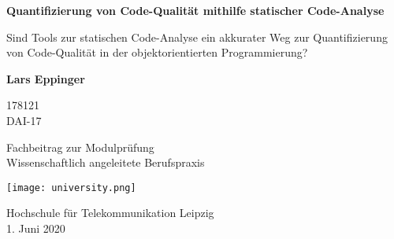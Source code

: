 \begin{titlepage}
    \begin{center}
        \vspace*{1cm}
        
        \Huge
        \textbf{Quantifizierung von Code-Qualität mithilfe statischer Code-Analyse}
        
        \vspace{0.5cm}
        \LARGE
        Sind Tools zur statischen Code-Analyse ein akkurater Weg zur Quantifizierung von Code-Qualität in der objektorientierten Programmierung?
        
        \vspace{1.5cm}
        
        \textbf{Lars Eppinger}

        \Large
        178121\\
        DAI-17
        
        \vfill
        
        Fachbeitrag zur Modulprüfung\\Wissenschaftlich angeleitete Berufspraxis
        
        \vspace{0.8cm}
        
        \texttt{[image: university.png]}
        
        \Large
        Hochschule für Telekommunikation Leipzig\\
        1. Juni 2020
        
    \end{center}
\end{titlepage}